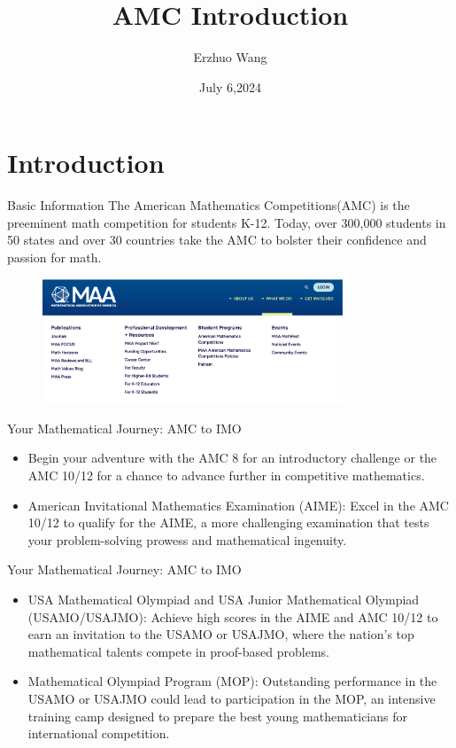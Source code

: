 \documentclass{beamer}
\title{AMC Introduction}
\institute{Youth STEM Academy}
\author{Erzhuo Wang}
\date{July 6,2024}
\theoremstyle{definition}
\begin{document}
\begin{frame}
    \titlepage
\end{frame}
\section{Introduction}
\begin{frame}{Basic Information}
    The American Mathematics Competitions(AMC)
    is the preeminent math competition for students K-12.
    Today, over 300,000 students in 50 states and over 30 countries take the AMC to
    bolster their confidence and passion for math.
    \begin{figure}
        \centering
        \includegraphics[width=0.8\textwidth]{MMA.png}
    \end{figure}
\end{frame}
\begin{frame}{Your Mathematical Journey: AMC to IMO}
    \begin{itemize}
        \item Begin your adventure with the AMC 8 for an introductory challenge or the
              AMC 10/12 for a chance to advance further in competitive mathematics.
        \item American Invitational Mathematics Examination (AIME):
              Excel in the AMC 10/12 to qualify for the AIME, a more challenging examination that tests your problem-solving prowess and mathematical ingenuity.
    \end{itemize}
\end{frame}
\begin{frame}{Your Mathematical Journey: AMC to IMO}
    \begin{itemize}
        \item USA Mathematical Olympiad and USA Junior Mathematical Olympiad (USAMO/USAJMO): Achieve high scores in the AIME and AMC 10/12 to earn an invitation to the USAMO or USAJMO, where the nation's top mathematical talents compete in proof-based problems.

        \item Mathematical Olympiad Program (MOP): Outstanding performance in the USAMO or USAJMO could lead to participation in the MOP, an intensive training camp designed to prepare the best young mathematicians for international competition.
    \end{itemize}
\end{frame}
\end{document}
